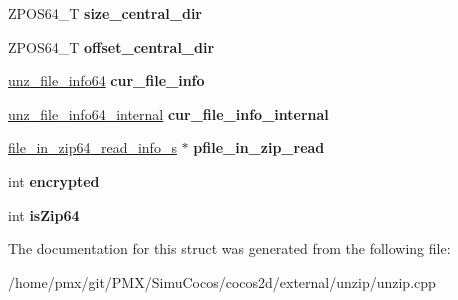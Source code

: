 \begin{DoxyCompactItemize}
\item 
\mbox{\label{structcocos2d_1_1unz64__s_ad1c94801e85f868961c8d56ae0f9c4b3}} 
Z\+P\+O\+S64\+\_\+T {\bfseries size\+\_\+central\+\_\+dir}
\item 
\mbox{\label{structcocos2d_1_1unz64__s_a5591a3bf30f969d65dc9d3eb737f7552}} 
Z\+P\+O\+S64\+\_\+T {\bfseries offset\+\_\+central\+\_\+dir}
\item 
\mbox{\label{structcocos2d_1_1unz64__s_a9bc2362dfbbeed5aa6e7804c9e9a825f}} 
\hyperlink{structcocos2d_1_1unz__file__info64__s}{unz\+\_\+file\+\_\+info64} {\bfseries cur\+\_\+file\+\_\+info}
\item 
\mbox{\label{structcocos2d_1_1unz64__s_ac512cee4c908183dd3605f25c3d33256}} 
\hyperlink{structcocos2d_1_1unz__file__info64__internal__s}{unz\+\_\+file\+\_\+info64\+\_\+internal} {\bfseries cur\+\_\+file\+\_\+info\+\_\+internal}
\item 
\mbox{\label{structcocos2d_1_1unz64__s_a7f270c0bb43752ba29c19bb70339d198}} 
\hyperlink{structcocos2d_1_1file__in__zip64__read__info__s}{file\+\_\+in\+\_\+zip64\+\_\+read\+\_\+info\+\_\+s} $\ast$ {\bfseries pfile\+\_\+in\+\_\+zip\+\_\+read}
\item 
\mbox{\label{structcocos2d_1_1unz64__s_a3757b981775ae67ceff7f13c018329b5}} 
int {\bfseries encrypted}
\item 
\mbox{\label{structcocos2d_1_1unz64__s_a105ff1505c41852135e412767e71eebe}} 
int {\bfseries is\+Zip64}
\end{DoxyCompactItemize}


The documentation for this struct was generated from the following file\+:\begin{DoxyCompactItemize}
\item 
/home/pmx/git/\+P\+M\+X/\+Simu\+Cocos/cocos2d/external/unzip/unzip.\+cpp\end{DoxyCompactItemize}

